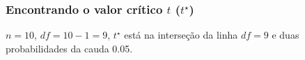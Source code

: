 \begin{frame}
\frametitle{Encontrando o valor crítico $t$ ($t^\star$)}

{\justifying
$n = 10$, $df = 10 - 1 = 9$, $t^\star$ está na interseção da linha $ df = 9 $ e duas probabilidades da cauda 0.05.
}

\end{frame}

